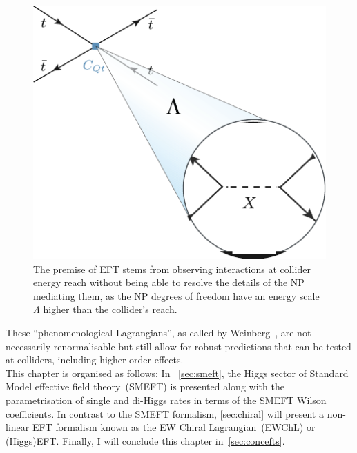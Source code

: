 \begin{figure}[h!]
	\begin{center}
		\includegraphics[width=.4 \linewidth]{figures/EFT}
		\caption{The premise of EFT stems from observing interactions at collider energy reach without being able to resolve the details of the NP mediating them, as the NP degrees of freedom have an energy scale $\Lambda$ higher than the collider's reach. }
		\label{fig:eft}
	\end{center}
\end{figure}
These ``phenomenological Lagrangians'', as called by Weinberg~\cite{WEINBERG1979327}, are not necessarily renormalisable but still allow for robust predictions that can be tested at colliders, including higher-order effects. \\
This chapter is organised as follows:  In ~\autoref{sec:smeft}, the Higgs sector of Standard Model effective field theory~(SMEFT) is presented along with the parametrisation of single and di-Higgs rates in terms of the SMEFT Wilson coefficients. In contrast to the SMEFT formalism, \autoref{sec:chiral} will present a non-linear EFT formalism known as the EW Chiral Lagrangian~(EWChL) or (Higgs)EFT. Finally, I will conclude this chapter in~\autoref{sec:concefts}.
